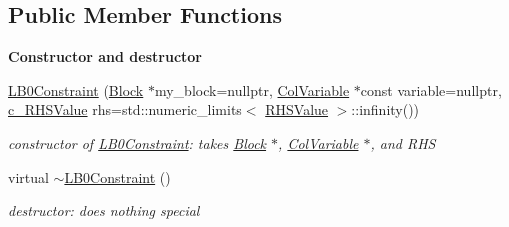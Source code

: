 \subsection*{Public Member Functions}
\begin{Indent}\textbf{ Constructor and destructor}\par
\begin{DoxyCompactItemize}
\item 
\mbox{\hyperlink{class_s_m_spp__di__unipi__it_1_1_l_b0_constraint_a76ca4d663bcddf3dd18aff813e18c0c3}{L\+B0\+Constraint}} (\mbox{\hyperlink{class_s_m_spp__di__unipi__it_1_1_block}{Block}} $\ast$my\+\_\+block=nullptr, \mbox{\hyperlink{class_s_m_spp__di__unipi__it_1_1_col_variable}{Col\+Variable}} $\ast$const variable=nullptr, \mbox{\hyperlink{class_s_m_spp__di__unipi__it_1_1_row_constraint_a34abd4b01d3a2024be5f6d13dd88779f}{c\+\_\+\+R\+H\+S\+Value}} rhs=std\+::numeric\+\_\+limits$<$ \mbox{\hyperlink{class_s_m_spp__di__unipi__it_1_1_row_constraint_a8813536ab3b13a81c8e83a999ade3bd8}{R\+H\+S\+Value}} $>$\+::infinity())
\begin{DoxyCompactList}\small\item\em constructor of \mbox{\hyperlink{class_s_m_spp__di__unipi__it_1_1_l_b0_constraint}{L\+B0\+Constraint}}\+: takes \mbox{\hyperlink{class_s_m_spp__di__unipi__it_1_1_block}{Block}} $\ast$, \mbox{\hyperlink{class_s_m_spp__di__unipi__it_1_1_col_variable}{Col\+Variable}} $\ast$, and R\+HS \end{DoxyCompactList}\item 
\mbox{\label{class_s_m_spp__di__unipi__it_1_1_l_b0_constraint_a830196aeb9f476af76ae693a87f1c2b2}} 
virtual \mbox{\hyperlink{class_s_m_spp__di__unipi__it_1_1_l_b0_constraint_a830196aeb9f476af76ae693a87f1c2b2}{$\sim$\+L\+B0\+Constraint}} ()
\begin{DoxyCompactList}\small\item\em destructor\+: does nothing special \end{DoxyCompactList}\end{DoxyCompactItemize}
\end{Indent}

